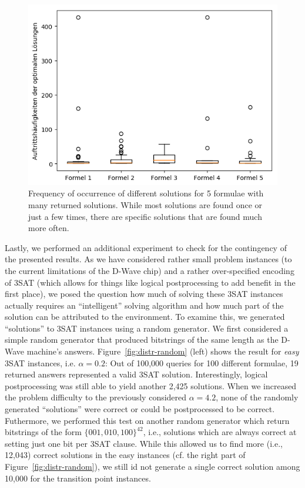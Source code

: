 \begin{figure}
\centering
\includegraphics[width=.8\textwidth]{../material_2/25_clauses__4_2_def_MISBIAS.png}
\caption{Frequency of occurrence of different solutions for 5 formulae with many returned solutions. While most solutions are found once or just a few times, there are specific solutions that are found much more often.} \label{fig:distr-sols}
\end{figure}

Lastly, we performed an additional experiment to check for the contingency of the presented results. As we have considered rather small problem instances (to the current limitations of the D-Wave chip) and a rather over-specified encoding of 3SAT (which allows for things like logical postprocessing to add benefit in the first place), we posed the question how much of solving these 3SAT instances actually requires an ``intelligent'' solving algorithm and how much part of the solution can be attributed to the environment. To examine this, we generated ``solutions'' to 3SAT instances using a random generator. We first considered a simple random generator that produced bitstrings of the same length as the D-Wave machine's answers. Figure~\ref{fig:distr-random} (left) shows the result for \emph{easy} 3SAT instances, i.e. $\alpha = 0.2$: Out of 100,000 queries for 100 different formulae, 19 returned answers represented a valid 3SAT solution. Interestingly, logical postprocessing was still able to yield another 2,425 solutions. When we increased the problem difficulty to the previously considered $\alpha = 4.2$, none of the randomly generated ``solutions'' were correct or could be postprocessed to be correct. Futhermore, we performed this test on another random generator which return bitstrings of the form $\{001, 010, 100\}^{42}$, i.e., solutions which are always correct at setting just one bit per 3SAT clause. While this allowed us to find more (i.e., 12,043) correct solutions in the easy instances  (cf. the right part of Figure~\ref{fig:distr-random}), we still id not generate a single correct solution among 10,000 for the transition point instances.


